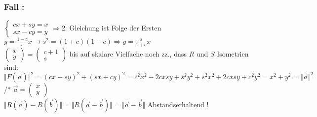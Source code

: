 \subsubsection{Fall :}
$\begin{cases} 
cx + sy = x  \\ 
sx -cy = y
\end{cases}
\Rightarrow $2. Gleichung ist Folge der Ersten\\
$y = \frac{1-c}{s}x\rightarrow s^{2} = (1+c)(1-c)\Rightarrow y=\frac{s}{1+c}x$\\
$\begin{pmatrix} x \\ y \end{pmatrix} = \begin{pmatrix} c+1 \\ s \end{pmatrix}$ bis auf skalare Vielfache noch zz., dass $R$ und $S$ Isometrien sind:\\
$\Vert F(\vec{a})\Vert^{2} = (cx-sy)^{2}+(sx+cy)^{2} = c^{2}x^{2}-2cxsy+s^{2}y^{2}+s^{2}x^{2}+2cxsy + c^{2} y^{2} = x^{2}+y^{2}=\Vert\vec{a}\Vert^{2}$ /* $\vec{a}=\begin{pmatrix} x \\ y \end{pmatrix}$\\
$\Vert R(\vec{a})-R(\vec{b})\Vert = \Vert R (\vec{a}-\vec{b})\Vert = \Vert \vec{a}-\vec{b}\Vert$ \large{Abstandserhaltend !} \normalsize{}\\
%
%
%
